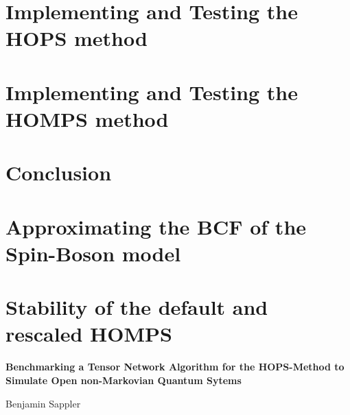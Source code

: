 \documentclass[%
thesis=student,%
coverpage=false,%
titlepage=false,%
headmarks=true, %
twoside=false,
english,%
font=libertine, %
math=newpxtx, %
BCOR=5mm,%
coverBCOR=11mm,%
]{tumbook}
\begin{document}
\begin{refsection}
\chapter{Implementing and Testing the HOPS method}
\label{chap:Implementing_HOPS}


\chapter{Implementing and Testing the HOMPS method}
\label{chap:Implementing_HOMPS}


\chapter{Conclusion}
\label{chap:Conclusion}


\appendix
\chapter{Approximating the BCF of the Spin-Boson model}
\label{app:Approximating_BCF_Spin_Boson}

\chapter{Stability of the default and rescaled HOMPS}
\label{app:default_vs_rescaled}


\backmatter{}

\printbibliography{} %
\end{refsection}
\begin{refsection}
\nocite{Website:ColorBrewer}
\nocite{Website:ColorBlind}
\printbibliography[heading=subbibliography, title={Resources for Plotting}]
\end{refsection}

\newpage
\thispagestyle{empty}
\noindent\textbf{\large Benchmarking a Tensor Network Algorithm for the HOPS-Method to Simulate Open non-Markovian Quantum Sytems}
\vspace*{0.5cm}
\par\noindent Benjamin Sappler
\end{document}
